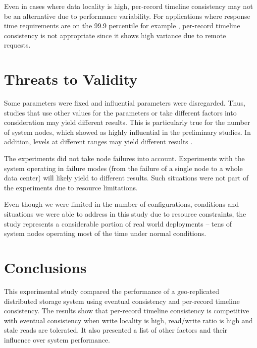 \documentclass[man,floatsintext,12pt]{apa6}
\begin{document}
Even in cases where data locality is high, per-record timeline consistency may
not be an alternative due to performance variability. For applications where
response time requirements are on the 99.9 percentile for example
\parencite{DeCandia2007}, per-record timeline consistency is not appropriate
since it shows high variance due to remote requests.

\label{threats_to_validity}
\section{Threats to Validity}

Some parameters were fixed and influential parameters were disregarded. Thus,
studies that use other values for the parameters or take different factors into
consideration may yield different results. This is particularly true for the
number of system nodes, which showed as highly influential in the preliminary
studies. In addition, levels at different ranges may yield different results
\parencite{Jain1991}.

The experiments did not take node failures into account. Experiments with the
system operating in failure modes (from the failure of a single node to a
whole data center) will likely yield to different results. Such situations were
not part of the experiments due to resource limitations.

Even though we were limited in the number of configurations, conditions and
situations we were able to address in this study due to resource constraints,
the study represents a considerable portion of real world deployments -- tens
of system nodes operating most of the time under normal conditions.

\section{Conclusions}

This experimental study compared the performance of a geo-replicated
distributed storage system using eventual consistency and per-record timeline
consistency. The results show that per-record timeline consistency is
competitive with eventual consistency when write locality is high, read/write
ratio is high and stale reads are tolerated. It also presented a list of other
factors and their influence over system performance.
\end{document}
